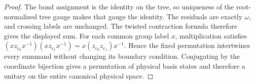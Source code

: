 \begin{proof}\leanok
    The bond assignment is the identity on the tree, so uniqueness of the
    root-normalized tree gauge makes that gauge the identity. The residuals
    are exactly $\omega$, and crossing labels are unchanged.
    The twisted contraction formula therefore gives the displayed sum.
    For each common group label $x$, multiplication satisfies
    $(xz_{e_0}x^{-1})(xz_{e_1}x^{-1})=x(z_{e_0}z_{e_1})x^{-1}$.
    Hence the fixed permutation intertwines every summand without changing
    its boundary condition. Conjugating by the coordinate bijection
    gives a permutation of physical basis states and therefore a unitary
    on the entire canonical physical space.
\end{proof}
